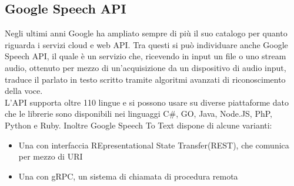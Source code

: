 \subsection{Google Speech API}
Negli ultimi anni Google ha ampliato sempre di pi\`u il suo catalogo per quanto riguarda
i servizi cloud e web API.
Tra questi si pu\`o individuare anche Google Speech API, il quale \`e un
servizio che, ricevendo in input un file o uno stream audio, ottenuto per mezzo di un'acquisizione
da un dispositivo di audio input, traduce il parlato in testo scritto tramite algoritmi avanzati
di riconoscimento della voce.\\
L'API supporta oltre 110 lingue e si possono usare su diverse piattaforme dato che
le librerie sono disponibili nei linguaggi C\#, GO, Java, Node.JS, PhP, Python e Ruby.
Inoltre Google Speech To Text dispone di alcune varianti:
\begin{itemize}
\item Una con interfaccia REpresentational State Transfer(REST), che comunica per mezzo di URI
\item Una con gRPC, un sistema di chiamata di procedura remota
\end{itemize}

\iffalse
\section{Model-View-Design}
Il Model-View-Design (MVC) \`e un pattern architetturale che suddivide lo sviluppo di un'applicazione web in 3 parti:
\begin{itemize}
\item Model(Modello), sono oggetti che rappresentano lo stato dell'applicazione e operazioni logiche da eseguire sul primo. Di solito
lo stato del modello viene estratto, manipolato per mezzo di operazioni e salvato da un database con cui comunicano,
oppure passato al controller.
\item Controller, \`e un'interfaccia che comunica tra il Model, la View e l'Utente. Il suo compito \`e di gestire le richieste dell'utente,
il quale comunica tramite input ed interazioni, utilizzando il modello che rientra nel dominio
dei dati inerente alla richiesta e selezionando una View per il rendering dell'interfaccia utente.
\item View(Visualizzazione), ha il compito di far visualizzare all'utente i dati estratti tramite un'interfaccia grafica, che viene creata
partendo da un modello HTML.\\[2\baselineskip]
\end{itemize}
\begin{figure}[H]
    \texttt{[image: mvc]}
    \caption{MVC Pattern}
\end{figure}
\fi

